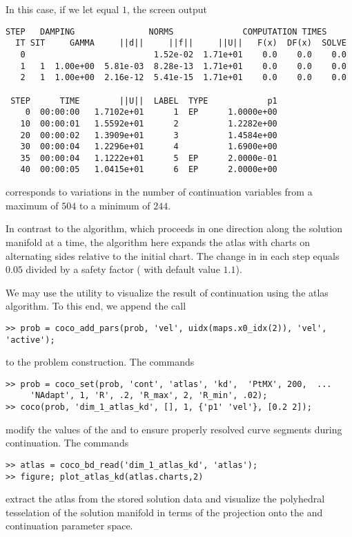 In this case, if we let  equal $1$, the screen output
\begin{lstlisting}[language=coco-highlight]
    STEP   DAMPING               NORMS              COMPUTATION TIMES
  IT SIT     GAMMA     ||d||     ||f||     ||U||   F(x)  DF(x)  SOLVE
   0                          1.52e-02  1.71e+01    0.0    0.0    0.0
   1   1  1.00e+00  5.81e-03  8.28e-13  1.71e+01    0.0    0.0    0.0
   2   1  1.00e+00  2.16e-12  5.41e-15  1.71e+01    0.0    0.0    0.0

 STEP      TIME        ||U||  LABEL  TYPE            p1
    0  00:00:00   1.7102e+01      1  EP      1.0000e+00
   10  00:00:01   1.5592e+01      2          1.2282e+00
   20  00:00:02   1.3909e+01      3          1.4584e+00
   30  00:00:04   1.2296e+01      4          1.6900e+00
   35  00:00:04   1.1222e+01      5  EP      2.0000e-01
   40  00:00:05   1.0415e+01      6  EP      2.0000e+00
\end{lstlisting}
corresponds to variations in the number of continuation variables from a maximum of $504$ to a minimum of $244$.

In contrast to the  algorithm, which proceeds in one direction along the solution manifold at a time, the  algorithm here expands the atlas with charts on alternating sides relative to the initial chart. The change in  in each step equals $0.05$ divided by a safety factor ( with default value $1.1$).

We may use the  utility to visualize the result of continuation using the  atlas algorithm. To this end, we append the call
\begin{lstlisting}[language=coco-highlight]
>> prob = coco_add_pars(prob, 'vel', uidx(maps.x0_idx(2)), 'vel', 'active');
\end{lstlisting}
to the problem construction. The commands
\begin{lstlisting}[language=coco-highlight]
>> prob = coco_set(prob, 'cont', 'atlas', 'kd',  'PtMX', 200,  ...
     'NAdapt', 1, 'R', .2, 'R_max', 2, 'R_min', .02);
>> coco(prob, 'dim_1_atlas_kd', [], 1, {'p1' 'vel'}, [0.2 2]);
\end{lstlisting}
modify the values of the  and  to ensure properly resolved curve segments during continuation. The commands
\begin{lstlisting}[language=coco-highlight]
>> atlas = coco_bd_read('dim_1_atlas_kd', 'atlas');
>> figure; plot_atlas_kd(atlas.charts,2)
\end{lstlisting}
extract the atlas from the stored solution data and visualize the polyhedral tesselation of the solution manifold in terms of the projection onto the  and  continuation parameter space.

